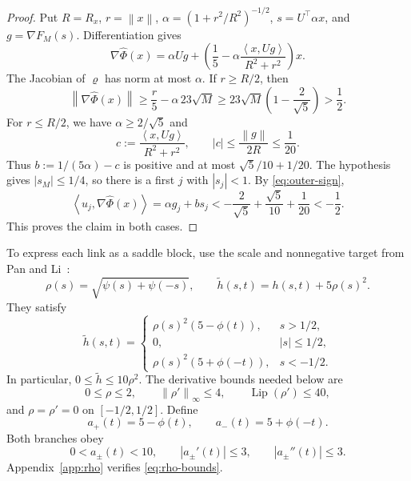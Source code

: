 \documentclass[11pt,a4paper]{article}
\newcommand{\norm}[1]{\left\lVert #1\right\rVert}
\newcommand{\ip}[2]{\left\langle #1,#2\right\rangle}
\newcommand{\Lip}{\operatorname{Lip}}
\theoremstyle{definition}
\theoremstyle{remark}
\numberwithin{equation}{section}
\begin{document}
\begin{proof}
Put $R=R_x$, $r=\norm x$,
$\alpha=(1+r^2/R^2)^{-1/2}$, $s=U^\top\alpha x$, and
$g=\nabla F_M(s)$. Differentiation gives
\[
 \nabla\widehat\Phi(x)
 =\alpha Ug+
 \left(\frac15-\alpha\frac{\ip{x}{Ug}}{R^2+r^2}\right)x.
\]
The Jacobian of $\varrho$ has norm at most $\alpha$.
If $r\ge R/2$, then
\[
 \norm{\nabla\widehat\Phi(x)}
 \ge\frac r5-\alpha\,23\sqrt M
 \ge23\sqrt M\left(1-\frac2{\sqrt5}\right)>\frac12.
\]
For $r\le R/2$, we have $\alpha\ge2/\sqrt5$ and
\[
 c:=\frac{\ip{x}{Ug}}{R^2+r^2},\qquad
 |c|\le\frac{\norm g}{2R}\le\frac1{20}.
\]
Thus $b:=1/(5\alpha)-c$ is positive and at most
$\sqrt5/10+1/20$. The hypothesis gives $|s_M|\le1/4$,
so there is a first $j$ with $|s_j|<1$. By
\eqref{eq:outer-sign},
\[
 \ip{u_j}{\nabla\widehat\Phi(x)}
 =\alpha g_j+bs_j
 <-\frac2{\sqrt5}+\frac{\sqrt5}{10}+\frac1{20}
 <-\frac12.
\]
This proves the claim in both cases.
\end{proof}

To express each link as a saddle block, use the scale and nonnegative
target from Pan and Li~\cite{panli}:
\begin{equation}
 \rho(s)=\sqrt{\psi(s)+\psi(-s)},\qquad
 \widetilde h(s,t)=h(s,t)+5\rho(s)^2.
 \label{eq:outer-rho-target}
\end{equation}
They satisfy
\begin{equation}
 \widetilde h(s,t)=
 \begin{cases}
  \rho(s)^2(5-\phi(t)),&s>1/2,\\
  0,&|s|\le1/2,\\
  \rho(s)^2(5+\phi(-t)),&s<-1/2.
 \end{cases}
 \label{eq:target-branches}
\end{equation}
In particular, $0\le\widetilde h\le10\rho^2$. The derivative bounds
needed below are
\begin{equation}
 0\le\rho\le2,\qquad
 \norm{\rho'}_\infty\le4,\qquad
 \Lip(\rho')\le40,
 \label{eq:rho-bounds}
\end{equation}
and $\rho=\rho'=0$ on $[-1/2,1/2]$. Define
\begin{equation}
 a_+(t)=5-\phi(t),\qquad a_-(t)=5+\phi(-t).
 \label{eq:a-branches}
\end{equation}
Both branches obey
\begin{equation}
 0<a_\pm(t)<10,\qquad |a_\pm'(t)|\le3,\qquad
 |a_\pm''(t)|\le3.
 \label{eq:a-bounds}
\end{equation}
Appendix~\ref{app:rho} verifies \eqref{eq:rho-bounds}.
\end{document}
